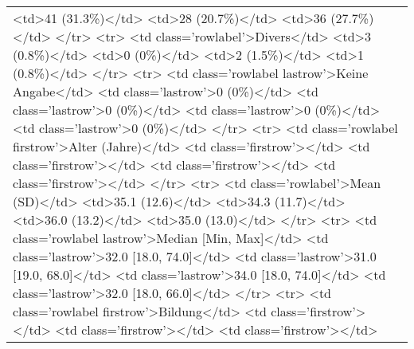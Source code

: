 \begin{table}[!tbp]
\begin{center}
\begin{tabular}{l}
\textless td\textgreater 41 (31.3\%)\textless /td\textgreater 
\textless td\textgreater 28 (20.7\%)\textless /td\textgreater 
\textless td\textgreater 36 (27.7\%)\textless /td\textgreater 
\textless /tr\textgreater 
\textless tr\textgreater 
\textless td class='rowlabel'\textgreater Divers\textless /td\textgreater 
\textless td\textgreater 3 (0.8\%)\textless /td\textgreater 
\textless td\textgreater 0 (0\%)\textless /td\textgreater 
\textless td\textgreater 2 (1.5\%)\textless /td\textgreater 
\textless td\textgreater 1 (0.8\%)\textless /td\textgreater 
\textless /tr\textgreater 
\textless tr\textgreater 
\textless td class='rowlabel lastrow'\textgreater Keine Angabe\textless /td\textgreater 
\textless td class='lastrow'\textgreater 0 (0\%)\textless /td\textgreater 
\textless td class='lastrow'\textgreater 0 (0\%)\textless /td\textgreater 
\textless td class='lastrow'\textgreater 0 (0\%)\textless /td\textgreater 
\textless td class='lastrow'\textgreater 0 (0\%)\textless /td\textgreater 
\textless /tr\textgreater 
\textless tr\textgreater 
\textless td class='rowlabel firstrow'\textgreater Alter (Jahre)\textless /td\textgreater 
\textless td class='firstrow'\textgreater \textless /td\textgreater 
\textless td class='firstrow'\textgreater \textless /td\textgreater 
\textless td class='firstrow'\textgreater \textless /td\textgreater 
\textless td class='firstrow'\textgreater \textless /td\textgreater 
\textless /tr\textgreater 
\textless tr\textgreater 
\textless td class='rowlabel'\textgreater Mean (SD)\textless /td\textgreater 
\textless td\textgreater 35.1 (12.6)\textless /td\textgreater 
\textless td\textgreater 34.3 (11.7)\textless /td\textgreater 
\textless td\textgreater 36.0 (13.2)\textless /td\textgreater 
\textless td\textgreater 35.0 (13.0)\textless /td\textgreater 
\textless /tr\textgreater 
\textless tr\textgreater 
\textless td class='rowlabel lastrow'\textgreater Median [Min, Max]\textless /td\textgreater 
\textless td class='lastrow'\textgreater 32.0 [18.0, 74.0]\textless /td\textgreater 
\textless td class='lastrow'\textgreater 31.0 [19.0, 68.0]\textless /td\textgreater 
\textless td class='lastrow'\textgreater 34.0 [18.0, 74.0]\textless /td\textgreater 
\textless td class='lastrow'\textgreater 32.0 [18.0, 66.0]\textless /td\textgreater 
\textless /tr\textgreater 
\textless tr\textgreater 
\textless td class='rowlabel firstrow'\textgreater Bildung\textless /td\textgreater 
\textless td class='firstrow'\textgreater \textless /td\textgreater 
\textless td class='firstrow'\textgreater \textless /td\textgreater 
\textless td class='firstrow'\textgreater \textless /td\textgreater 

\end{tabular}
\end{center}
\end{table}
